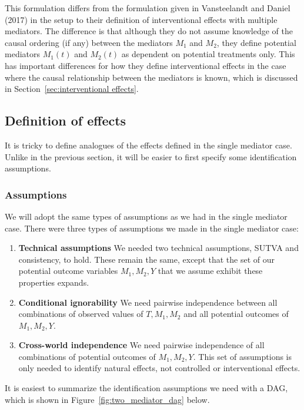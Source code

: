 \documentclass[12pt]{article} %
\numberwithin{equation}{section} %
\begin{document}
This formulation differs from the formulation given in Vansteelandt and Daniel (2017) in the setup to their definition of interventional effects with multiple mediators. The difference is that although they do not assume knowledge of the causal ordering (if any) between the mediators $M_{1}$ and $M_{2}$, they define potential mediators $M_{1}(t)$ and $M_{2}(t)$ as dependent on potential treatments only. This has important differences for how they define interventional effects in the case where the causal relationship between the mediators is known, which is discussed in Section~\ref{sec:interventional effects}. 


\subsection{Definition of effects}

It is tricky to define analogues of the effects defined in the single mediator case. Unlike in the previous section, it will be easier to first specify some identification assumptions. 

\subsubsection{Assumptions}
We will adopt the same types of assumptions as we had in the single mediator case. There were three types of assumptions we made in the single mediator case: 
\begin{enumerate}
    \item \textbf{Technical assumptions} We needed two technical assumptions, SUTVA and consistency, to hold. These remain the same, except that the set of our potential outcome variables $M_{1},M_{2},Y$ that we assume exhibit these properties expands. 
    \item \textbf{Conditional ignorability} We need pairwise independence between all combinations of observed values of $T, M_{1}, M_{2}$ and all potential outcomes of $M_{1},M_{2},Y$. 
    \item \textbf{Cross-world independence} We need pairwise independence of all combinations of potential outcomes of $M_{1}, M_{2},Y$. This set of assumptions is only needed to identify natural effects, not controlled or interventional effects. 
\end{enumerate}
It is easiest to summarize the identification assumptions we need with a DAG, which is shown in Figure~\ref{fig:two_mediator_dag} below.
\end{document}
